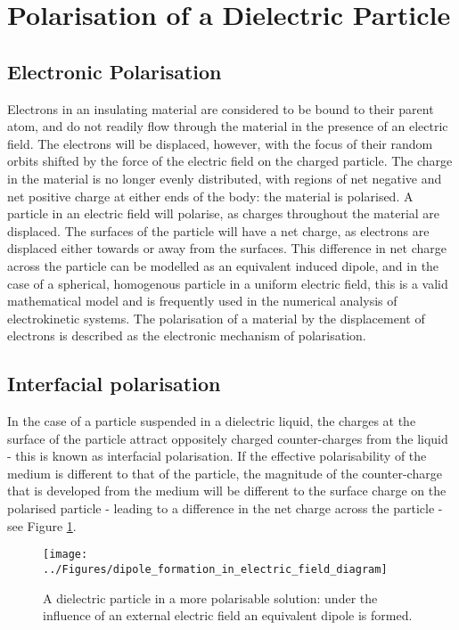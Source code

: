 \section{Polarisation of a Dielectric Particle}
\subsection{Electronic Polarisation}

Electrons in an insulating material are considered to be bound to their parent atom, and do not readily flow through the material in the presence of an electric field. The electrons will be displaced, however, with the focus of their random orbits shifted by the force of the electric field on the charged particle. The charge in the material is no longer evenly distributed, with regions of net negative and net positive charge at either ends of the body: the material is polarised. A particle in an electric field will polarise, as charges throughout the material are displaced. The surfaces of the particle will have a net charge, as electrons are displaced either towards or away from the surfaces. This difference in net charge across the particle can be modelled as an equivalent induced dipole, and in the case of a spherical, homogenous particle in a uniform electric field, this is a valid mathematical model and is frequently used in the numerical analysis of electrokinetic systems. The polarisation of a material by the displacement of electrons is described as the electronic mechanism of polarisation.

\subsection{Interfacial polarisation}

In the case of a particle suspended in a dielectric liquid, the charges at the surface of the particle attract oppositely charged counter-charges from the liquid - this is known as interfacial polarisation. If the effective polarisability of the medium is different to that of the particle, the magnitude of the counter-charge that is developed from the medium will be different to the surface charge on the polarised particle - leading to a difference in the net charge across the particle - see Figure \ref{fig:dipole_formation_in_electric_field_diagram}.

\begin{figure}
 \centering
 \texttt{[image: ../Figures/dipole\_formation\_in\_electric\_field\_diagram]}
 \caption{A dielectric particle in a more polarisable solution: under the influence of an external electric field an equivalent dipole is formed.}
 \label{fig:dipole_formation_in_electric_field_diagram}
\end{figure}

